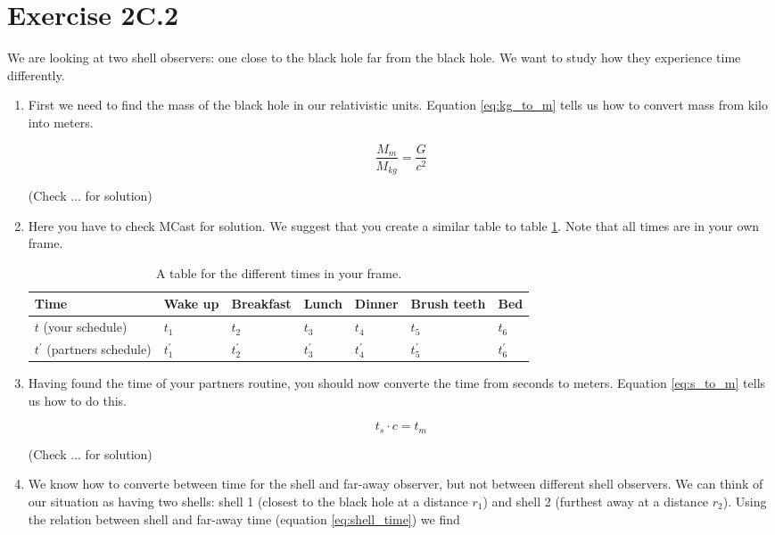 \documentclass[a4paper,10pt,english]{article}
\begin{document}
\section*{Exercise 2C.2}

We are looking at two shell observers: one close to the black hole far from the black hole. We want to study how they experience time differently.

\begin{enumerate}

\item First we need to find the mass of the black hole in our relativistic units. Equation \ref{eq:kg_to_m} tells us how to convert mass from kilo into meters. 

\[\frac{M_{m}}{M_{kg}}=\frac{G}{c^{2}}\] 

(Check $\ldots$ for solution)

\item Here you have to check MCast for solution. We suggest that you create a similar table to table \ref{table:1}. Note that all times are in your own frame.

  \begin{table}[H]
  \begin{center}
    \begin{tabular}{| l | l | l | l | l | l | l | }
   	\hline
	Time & Wake up & Breakfast & Lunch & Dinner & Brush teeth & Bed \\ \hline
	 $t$ (your schedule) & $t_{1}$ & $t_{2}$ & $t_{3}$ & $t_{4}$ & $t_{5}$ & $t_{6}$ \\ \hline
	 $t^{\prime}$ (partners schedule) & $t^{\prime}_{1}$ & $t^{\prime}_{2}$ & $t^{\prime}_{3}$ & $t^{\prime}_{4}$ & $t^{\prime}_{5}$ & $t^{\prime}_{6}$\\ \hline
	\end{tabular}
    \caption{A table for the different times in your frame.}
    \label{table:1}
  \end{center}
\end{table}


\item Having found the time of your partners routine, you should now converte the time from seconds to meters. Equation \ref{eq:s_to_m} tells us how to do this. 

\[t_{s}\cdot c=t_{m}\] 

(Check $\ldots$ for solution)

\item We know how to converte between time for the shell and far-away observer, but not between different shell observers. We can think of our situation as having two shells: shell 1 (closest to the black hole at a distance $r_{1}$) and shell 2 (furthest away at a distance $r_{2}$). Using the relation between shell and far-away time (equation \ref{eq:shell_time}) we find


\end{enumerate}
\end{document}
